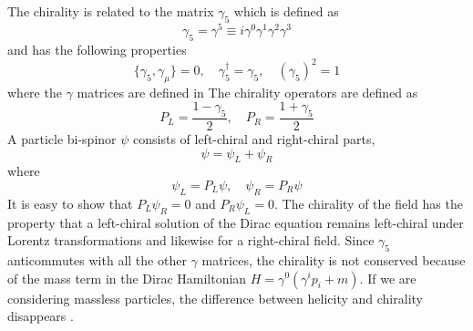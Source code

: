 \documentclass[12pt]{report}
\begin{document}
The chirality is related to the matrix $\gamma_{5}$ which is defined as
\begin{equation}
\gamma_{5} = \gamma^{5} \equiv i \gamma^{0} \gamma^{1} \gamma^{2} \gamma^{3}
\end{equation}
and has the following properties
\begin{equation}
\{ \gamma_{5}, \gamma_{\mu} \} = 0, \quad 
\gamma_{5}^{\dagger} = \gamma_{5}, \quad 
(\gamma_{5})^{2} = 1
\end{equation}
where the $\gamma$ matrices are defined in \cite{peskin_qft.}
The chirality operators are defined as
\begin{equation}
P_{L} = \frac{1 - \gamma_{5}}{2}, \quad 
P_{R} = \frac{1 + \gamma_{5}}{2}
\end{equation}
A particle bi-spinor $\psi$ consists of left-chiral and right-chiral parts,
\begin{equation}
\psi = \psi_{L} + \psi_{R}
\end{equation}
where
\begin{equation}
\psi_{L} = P_{L} \psi, \quad 
\psi_{R} = P_{R} \psi
\end{equation}
It is easy to show that $P_{L} \psi_{R} = 0$ and $P_{R} \psi_{L} = 0$.
The chirality of the field has the property that a left-chiral solution of the Dirac equation remains left-chiral under Lorentz transformations and likewise for a right-chiral field.
Since $\gamma_{5}$ anticommutes with all the other $\gamma$ matrices, the chirality is not conserved because of the mass term in the Dirac Hamiltonian $H = \gamma^{0} (\gamma^{i} p_{i} + m)$.
If we are considering massless particles, the difference between helicity and chirality disappears  \cite{arXiv:1006.1718v2}.
\end{document}

